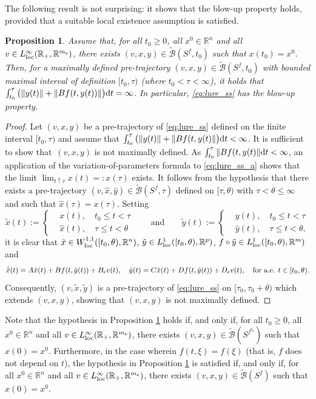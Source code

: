 \documentclass[a4paper,11pt]{article}
\newcommand{\R}{\mathbb R}
\newcommand{\sB}{{\mathcal B}}
\numberwithin{equation}{section}
\numberwithin{figure}{section}
\numberwithin{table}{section}
\newtheorem{proposition}[theorem]{Proposition}
\begin{document}
The following result is not surprising: it shows that the blow-up property holds, provided
that a suitable local existence assumption is satisfied.
%
\begin{proposition}\label{pro:blow_up}
Assume that, for all $t_0\geq 0$, all $x^0\in\R^n$ and all $v\in L^\infty_{\rm loc}(\R_+,\R^{m_{\rm e}})$, there exists $(v,x,y)\in\tilde\sB(S^f,t_0)$ such that $x(t_0)=x^0$.
Then, for a maximally defined pre-trajectory $(v,x,y)\in\tilde\sB(S^f,t_0)$ with bounded maximal interval of definition $[t_0,\tau)$ {\rm (}where $t_0<\tau<\infty${\rm)}, it holds that $\int_{t_0}^\tau\big(\|y(t)\|+\|Bf(t,y(t))\|\big){\rm d}t=\infty$. In
particular, \eqref{eq:lure_ss} has the blow-up property.
\end{proposition}
%
\begin{proof}  Let $(v,x,y)$ be a pre-trajectory of \eqref{eq:lure_ss} defined on the finite interval $[t_0,\tau)$ and assume that $\int_{t_0}^\tau\big(\|y(t)\|+\|Bf(t,y(t)\|\big){\rm d}t<\infty$. It is sufficient to show that~$(v,x,y)$ is not maximally defined.
As $\int_{t_0}^\tau\|Bf(t,y(t)\|{\rm d}t<\infty$, an application of the variation-of-parameters
formula to \eqref{eq:lure_ss_a} shows that the limit $\lim_{t\uparrow\tau}x(t)=:x(\tau)$ exists. It follows from the hypothesis that there exists a pre-trajectory $(v,\hat x,\hat y)\in\tilde\sB(S^f,\tau)$ defined on $[\tau,\theta)$ with $\tau<\theta\leq\infty$ and such that $\hat x(\tau)=x(\tau)$. Setting
\[
\tilde x(t):=\left\{\begin{aligned}
 & x(t), \quad t_0\leq t<\tau\\  & \hat x(t), \quad \tau\leq t<\theta
\end{aligned}\right.
\qquad\mbox{and}\qquad
\tilde y(t):=\left\{\begin{aligned}
 & y(t), \quad t_0\leq t<\tau\\  & \hat y(t), \quad \tau\leq t<\theta,
\end{aligned}\right.
\]
it is clear that $\tilde x\in W^{1,1}_{\rm loc}([t_0,\theta),\R^n)$,
$\tilde y\in L^1_{\rm loc}([t_0, \theta),\R^p)$, $f\circ \tilde y\in L^1_{\rm loc}([t_0,
\theta),\R^m)$ and
\[
\dot{\tilde x}(t)=A\tilde x(t)+Bf(t,\tilde y(t))+B_{\rm e}v(t),\quad
\tilde y(t)=C\tilde x(t)+Df(t,\tilde y(t))+D_{\rm e}v(t),\quad\mbox{for a.e.
$t\in[t_0,\theta)$.}
\]
Consequently, $(v,\tilde x,\tilde y)$ is a pre-trajectory of \eqref{eq:lure_ss} on $[\tau_0,\tau_0+\theta)$ which extends $(v,x,y)$, showing that $(v,x,y)$ is not maximally defined.
\end{proof}
%
Note that the hypothesis in Proposition \ref{pro:blow_up} holds if, and only if, for all $t_0\geq 0$, all $x^0\in\R^n$ and all $v\in L^\infty_{\rm loc}(\R_+,\R^{m_{\rm e}})$, there exists $(v,x,y)\in\tilde\sB(S^{f^{t_0}})$ such that $x(0)=x^0$. Furthermore, in the case wherein
$f(t,\xi)=f(\xi)$ (that is, $f$ does not depend on $t$), the hypothesis in Proposition \ref{pro:blow_up} is satisfied if, and only if, for all $x^0\in\R^n$ and all $v\in L^\infty_{\rm loc}(\R_+,\R^{m_{\rm e}})$, there exists $(v,x,y)\in\tilde\sB(S^f)$ such that $x(0)=x^0$.
\end{document}
